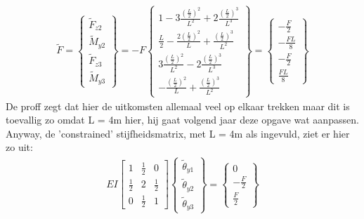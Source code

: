 \documentclass[a4paper,11pt,twoside]{report}
\begin{document}
\begin{align*}
    \tilde{F} =
    \begin{Bmatrix}
        \tilde{F}_{z2} \\
        \tilde{M}_{y2} \\
        \tilde{F}_{z3} \\
        \tilde{M}_{y3}
    \end{Bmatrix}
    =
    -F
    \begin{Bmatrix}
        1 - 3 \frac{\left(\frac{L}{2}\right)^2}{L^2} + 2 \frac{\left(\frac{L}{2}\right)^3}{L^3}      \\
        \frac{L}{2} - \frac{2\left(\frac{L}{2}\right)^2}{L} + \frac{\left(\frac{L}{2}\right)^3}{L^2} \\
        3 \frac{\left(\frac{L}{2}\right)^2}{L^2} - 2 \frac{\left(\frac{L}{2}\right)^3}{L^3}          \\
        -\frac{\left(\frac{L}{2}\right)^2}{L} + \frac{\left(\frac{L}{2}\right)^3}{L^2}
    \end{Bmatrix}
    =
    \begin{Bmatrix}
        -\frac{F}{2}  \\
        -\frac{FL}{8} \\
        -\frac{F}{2}  \\
        \frac{FL}{8}
    \end{Bmatrix}
\end{align*}
De proff zegt dat hier de uitkomsten allemaal veel op elkaar trekken maar dit is toevallig zo omdat
L = 4m hier, hij gaat volgend jaar deze opgave wat aanpassen.
\newline
\newline
Anyway, de 'constrained' stijfheidsmatrix, met L = 4m als ingevuld, ziet er hier zo uit:
\begin{align*}
    EI
    \begin{bmatrix}
        1           & \frac{1}{2} & 0           \\
        \frac{1}{2} & 2           & \frac{1}{2} \\
        0           & \frac{1}{2} & 1
    \end{bmatrix}
    \begin{Bmatrix}
        \tilde{\theta}_{y1} \\
        \tilde{\theta}_{y2} \\
        \tilde{\theta}_{y3}
    \end{Bmatrix}
    =
    \begin{Bmatrix}
        0            \\
        -\frac{F}{2} \\
        \frac{F}{2}
    \end{Bmatrix}
\end{align*}
\end{document}
